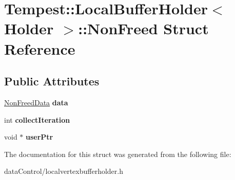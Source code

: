\hypertarget{struct_tempest_1_1_local_buffer_holder_1_1_non_freed}{\section{Tempest\+:\+:Local\+Buffer\+Holder$<$ Holder $>$\+:\+:Non\+Freed Struct Reference}
\label{struct_tempest_1_1_local_buffer_holder_1_1_non_freed}
}
\subsection*{Public Attributes}
\begin{DoxyCompactItemize}
\item 
\hypertarget{struct_tempest_1_1_local_buffer_holder_1_1_non_freed_a19f0314c767b5bbb0e24cd2e3c8e6b2b}{\hyperlink{struct_tempest_1_1_local_buffer_holder_1_1_non_freed_data}{Non\+Freed\+Data} {\bfseries data}}\label{struct_tempest_1_1_local_buffer_holder_1_1_non_freed_a19f0314c767b5bbb0e24cd2e3c8e6b2b}

\item 
\hypertarget{struct_tempest_1_1_local_buffer_holder_1_1_non_freed_ab1fc2dcda0f60d1ec1e3cf12137faf0c}{int {\bfseries collect\+Iteration}}\label{struct_tempest_1_1_local_buffer_holder_1_1_non_freed_ab1fc2dcda0f60d1ec1e3cf12137faf0c}

\item 
\hypertarget{struct_tempest_1_1_local_buffer_holder_1_1_non_freed_a1f81bf6a9b1e189b681529b110f859c4}{void $\ast$ {\bfseries user\+Ptr}}\label{struct_tempest_1_1_local_buffer_holder_1_1_non_freed_a1f81bf6a9b1e189b681529b110f859c4}

\end{DoxyCompactItemize}


The documentation for this struct was generated from the following file\+:\begin{DoxyCompactItemize}
\item 
data\+Control/localvertexbufferholder.\+h\end{DoxyCompactItemize}
